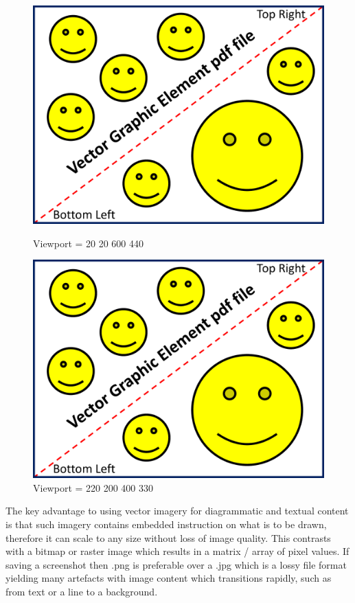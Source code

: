 \begin{figure}[H]
\begin{minipage}[t]{7.4cm}
\begin{center}
\includegraphics*[viewport= 20 20 600 440, width=.8\linewidth]{usingLatex/images/VectorGraphicElementPDF.pdf}
\caption{Viewport = 20 20 600 440}
\label{fig:using:Example1}
\end{center}
\end{minipage}
\hfill
\begin{minipage}[t]{7.4cm}
\begin{center}
\includegraphics*[viewport= 220 200 400 330, width=.8\linewidth]{usingLatex/images/VectorGraphicElementPDF.pdf}
\caption{Viewport = 220 200 400 330}
\label{fig:using:Example2}
\end{center}
\end{minipage}
\end{figure}

\clearpage
The key advantage to using vector imagery for diagrammatic and textual content is that such imagery contains embedded instruction on what is to be drawn, therefore it can scale to any size without loss of image quality. This contrasts with a bitmap or raster image which results in a matrix / array of pixel values. If saving a screenshot then  .png is preferable over a .jpg which is a lossy file format yielding many artefacts with image content which transitions rapidly, such as from text or a line to a background.


